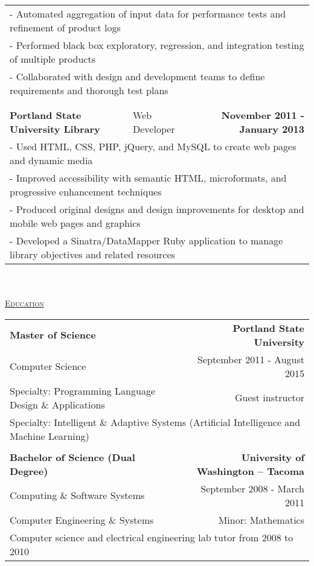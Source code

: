 \documentclass[letterpaper]{article}
\begin{document}
\begin{center}
\begin{tabular}{p{}p{}r}
				\multicolumn{3}{p{\textwidth}}{\quad\quad - Automated aggregation of input data for performance tests and refinement of product logs}
			\\
				\multicolumn{3}{p{\textwidth}}{\quad\quad - Performed black box exploratory, regression, and integration testing of multiple products} 
			\\
				\multicolumn{3}{p{\textwidth}}{\quad\quad - Collaborated with design and development teams to define requirements and thorough test plans}
			\\
			\\
			\\
				\textbf{Portland State University Library}						&
				Web Developer					&
				\textbf{November 2011 - January 2013 \quad}
			\\
				\multicolumn{3}{p{\textwidth}}{\quad\quad - Used HTML, CSS, PHP, jQuery, and MySQL to create web pages and dynamic media} 
			\\
				\multicolumn{3}{p{\textwidth}}{\quad\quad - Improved accessibility with semantic HTML, microformats, and progressive enhancement techniques} 
			\\
				\multicolumn{3}{p{\textwidth}}{\quad\quad - Produced original designs and design improvements for desktop and mobile web pages and graphics} 
			\\
				\multicolumn{3}{p{\textwidth}}{\quad\quad - Developed a Sinatra/DataMapper Ruby application to manage library objectives and related resources} 
		\end{tabular} \\
		\vspace{0.5in} \\ %
		\underline{\large \scshape Education}
		\begin{tabular}{p{}r}
				\textbf{Master of Science}							&
				\textbf{Portland State University \quad}
			\\
				\quad Computer Science\quad				&
				{September 2011 - August 2015 \quad\quad}
			\\
				\quad Specialty: Programming Language Design \& Applications		&		{Guest instructor \quad\quad}
			\\	
				\multicolumn{2}{p{\textwidth}}{\quad Specialty: Intelligent \& Adaptive Systems (Artificial Intelligence and Machine Learning)}
				
			\\
			\\
				\textbf{Bachelor of Science (Dual Degree)}			&
				\textbf{University of Washington -- Tacoma \quad}
			\\
				{\quad Computing \& Software Systems}						&
				{September 2008 - March 2011 \quad\quad}
			\\
				{\quad Computer Engineering \& Systems}						&
				{Minor: Mathematics \quad\quad}
			\\
				\multicolumn{2}{p{\textwidth}}{\quad Computer science and electrical engineering lab tutor from 2008 to 2010}	
				

\end{tabular}
\end{center}
\end{document}
